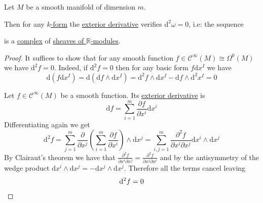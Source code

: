 \documentclass[../../main]{subfiles}
\begin{document}
\begin{lemma} \label{lemma:double-exterior-derivative-is-zero}
  Let \(M\) be a smooth manifold of dimension \(m\).

  Then for any \hyperref[def:smooth-k-form]{\(k\)-form} the \hyperref[def:exterior-derivative-k-form]{exterior derivative} verifies \(\mathrm{d}^{2} \omega = 0\), i.e: the sequence
  \begin{center}
  \end{center}
  is a \hyperref[def:complex]{complex} of \hyperref[def:sheaf-of-modules]{sheaves of \(\mathbb{R}\)-modules}.
\end{lemma}
\begin{proof}
  It suffices to show that for any smooth function \(f \in \mathcal{C}^{\infty}(M) \cong \Omega^{0}(M)\) we have \(\mathrm{d}^{2}f = 0\).
  Indeed, if \(\mathrm{d}^{2}f = 0\) then for any basic form \(f\mathrm{d}x^{I}\) we have
  \begin{equation*}
    \mathrm{d}(f\mathrm{d}x^{I}) = \mathrm{d}(\mathrm{d}f \wedge \mathrm{d}x^{I}) = \mathrm{d}^{2}f \wedge \mathrm{d}x^{I} - \mathrm{d}f \wedge \mathrm{d}^{2}x^{I} = 0
  \end{equation*}

  Let \(f \in \mathcal{C}^{\infty}(M)\) be a smooth function.
  Its \hyperref[def:exterior-derivative-k-form]{exterior derivative} is
  \begin{equation*}
    \mathrm{d}f = \sum_{i = 1}^{m} \frac{\partial f}{\partial x^{i}} \mathrm{d}x^{i}
  \end{equation*}
  Differentiating again we get
  \begin{equation*}
    \mathrm{d}^{2}f = \sum_{j=1}^{m} \frac{\partial}{\partial x^{j}} \left( \sum_{i=1}^{m}  \frac{\partial f}{\partial x^{i}} \right) \wedge \mathrm{d}x^{j} = \sum_{i,j=1}^{m} \frac{\partial^{2} f}{\partial x^{i} \partial x^{j}} \mathrm{d}x^{i} \wedge \mathrm{d}x^{j}
  \end{equation*}
  By Clairaut's theorem we have that \( \frac{\partial^{2} f}{\partial x^{i} \partial x^{j}} =  \frac{\partial^{2} f}{\partial x^{j} \partial x^{i}}\) and by the antisymmetry of the wedge product \(\mathrm{d}x^{i} \wedge \mathrm{d}x^{j} = - \mathrm{d}x^{j} \wedge \mathrm{d}x^{j}\).
  Therefore all the terms cancel leaving
  \begin{equation*}
    \mathrm{d}^{2} f = 0 \qedhere
  \end{equation*}
\end{proof}
\end{document}
